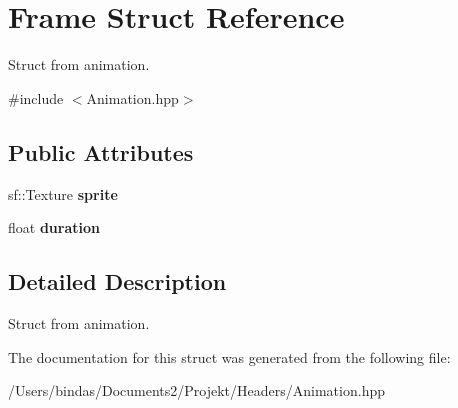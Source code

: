 \hypertarget{struct_frame}{}\section{Frame Struct Reference}
\label{struct_frame}


Struct from animation.  




{\ttfamily \#include $<$Animation.\+hpp$>$}

\subsection*{Public Attributes}
\begin{DoxyCompactItemize}
\item 
\mbox{\label{struct_frame_ac99edb9ad07fe5f5ce963485b958851c}} 
sf\+::\+Texture {\bfseries sprite}
\item 
\mbox{\label{struct_frame_aa785a4c1e14477e5beb8630004b34473}} 
float {\bfseries duration}
\end{DoxyCompactItemize}


\subsection{Detailed Description}
Struct from animation. 

The documentation for this struct was generated from the following file\+:\begin{DoxyCompactItemize}
\item 
/\+Users/bindas/\+Documents2/\+Projekt/\+Headers/Animation.\+hpp\end{DoxyCompactItemize}
